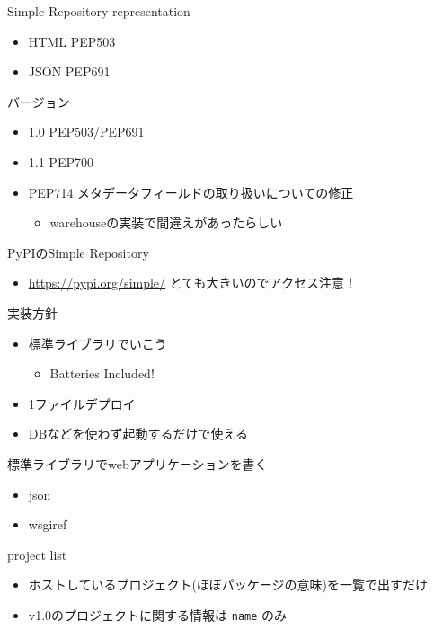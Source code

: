 \documentclass[presentation]{beamer}
\begin{document}
\begin{frame}[label={sec:orga5606b5}]{Simple Repository}
representation

\begin{itemize}
\item HTML PEP503
\item JSON PEP691
\end{itemize}

バージョン
\begin{itemize}
\item 1.0 PEP503/PEP691
\item 1.1 PEP700
\item PEP714 メタデータフィールドの取り扱いについての修正
\begin{itemize}
\item warehouseの実装で間違えがあったらしい
\end{itemize}
\end{itemize}
\end{frame}

\begin{frame}[label={sec:orgd71f03a}]{PyPIのSimple Repository}
\begin{itemize}
\item \url{https://pypi.org/simple/} とても大きいのでアクセス注意！
\end{itemize}
\end{frame}


\begin{frame}[label={sec:orga0cbf99}]{実装方針}
\begin{itemize}
\item 標準ライブラリでいこう
\begin{itemize}
\item Batteries Included!
\end{itemize}
\item 1ファイルデプロイ
\item DBなどを使わず起動するだけで使える
\end{itemize}
\end{frame}

\begin{frame}[label={sec:orgfa31f24}]{標準ライブラリでwebアプリケーションを書く}
\begin{itemize}
\item json
\item wsgiref
\end{itemize}
\end{frame}

\begin{frame}[label={sec:orgf5ee2dd},fragile]{project list}
 \begin{itemize}
\item ホストしているプロジェクト(ほぼパッケージの意味)を一覧で出すだけ
\item v1.0のプロジェクトに関する情報は \texttt{name} のみ
\end{itemize}
\end{frame}
\end{document}
